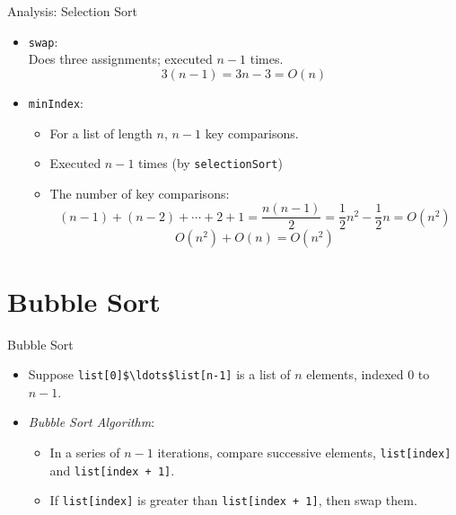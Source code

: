 \documentclass[14pt,aspectratio=1610]{beamer}
\begin{document}
\begin{frame}{Analysis: Selection Sort}
\begin{itemize}
  \item
    \texttt{swap}:\\
    Does three assignments; executed \(n - 1\) times.
    \begin{equation*}
      3(n - 1) = 3n - 3 = O(n)
    \end{equation*}
  \item<2->
    \texttt{minIndex}:
    \begin{itemize}
      \item
        For a list of length \(n\), \(n - 1\) key comparisons.
      \item
        Executed \(n - 1\) times (by \texttt{selectionSort})
      \item
        The number of key comparisons:
        \begin{equation*}
          (n-1)+(n-2)+\cdots+2+1=\frac{n(n-1)}{2}=\frac{1}{2} n^{2}-\frac{1}{2}n=O(n^{2})
        \end{equation*}
        \begin{equation*}
          O(n^2) + O(n) = O(n^2)
        \end{equation*}
  \end{itemize}
\end{itemize}
\end{frame}

\section{Bubble Sort}

\begin{frame}{Bubble Sort}
\begin{itemize}\setlength\itemsep{0.5em}
  \item
    Suppose \lstinline[mathescape=true]|list[0]$\ldots$list[n-1]| is a list of \(n\) elements, indexed \(0\) to \(n-1\).

  \item<2->
    \emph{Bubble Sort Algorithm}:
    \begin{itemize}\setlength\itemsep{0.5em}
      \item
        In a series of \(n-1\) iterations, compare successive elements, \lstinline{list[index]} and \lstinline{list[index + 1]}.
      \item
        If \lstinline{list[index]} is greater than \lstinline{list[index + 1]}, then swap them.
    \end{itemize}
\end{itemize}
\end{frame}
\end{document}
